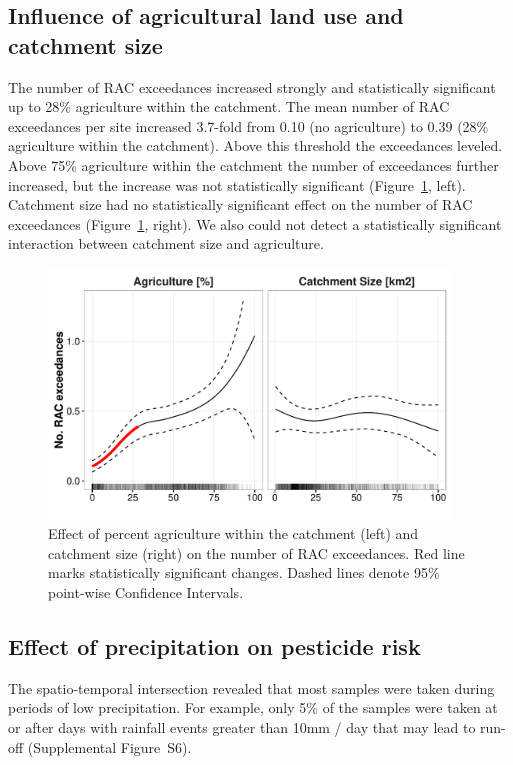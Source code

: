 \documentclass[journal=esthag,manuscript=article]{achemso}
\begin{document}
\subsection{Influence of agricultural land use and catchment size}
The number of RAC exceedances increased strongly and statistically significant up to 28\% agriculture within the catchment.
The mean number of RAC exceedances per site increased 3.7-fold from 0.10 (no agriculture) to 0.39 (28\% agriculture within the catchment). 
Above this threshold the exceedances leveled.
Above 75\% agriculture within the catchment the number of exceedances further increased, but the increase was not statistically significant (Figure~\ref{fig:fig4}, left). 
Catchment size had no statistically significant effect on the number of RAC exceedances (Figure~\ref{fig:fig4}, right).
We also could not detect a statistically significant interaction between catchment size and agriculture. 

\begin{figure}[ht]
  \includegraphics[width=0.95\textwidth]{figure4.pdf}
  \caption{Effect of percent agriculture within the catchment (left) and catchment size (right) on the number of RAC exceedances. Red line marks statistically significant changes. Dashed lines denote 95\% point-wise Confidence Intervals.
  }
  \label{fig:fig4}
\end{figure}


\subsection{Effect of precipitation on pesticide risk}
The spatio-temporal intersection revealed that most samples were taken during periods of low precipitation.
For example, only 5\% of the samples were taken at or after days with rainfall events greater than 10mm / day that may lead to run-off (Supplemental Figure~S6). 
\end{document}
